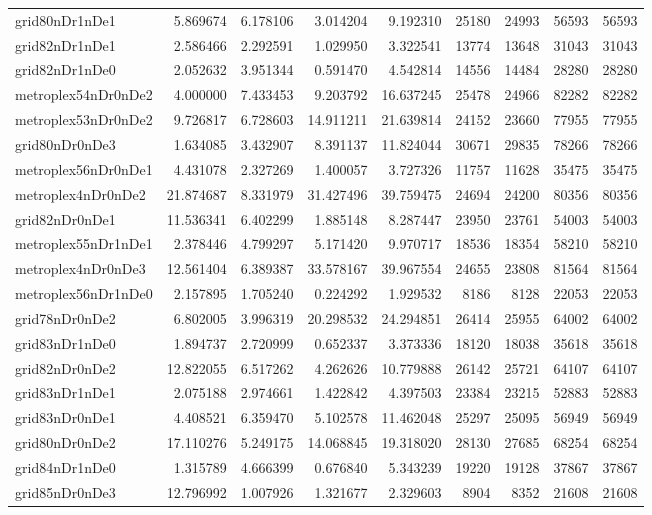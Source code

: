 \begin{longtable}{|l|r|r|r|r|r|r|r|r|}
grid80nDr1nDe1 & 5.869674 & 6.178106 & 3.014204 & 9.192310 & 25180 & 24993 & 56593 & 56593 \\
grid82nDr1nDe1 & 2.586466 & 2.292591 & 1.029950 & 3.322541 & 13774 & 13648 & 31043 & 31043 \\
grid82nDr1nDe0 & 2.052632 & 3.951344 & 0.591470 & 4.542814 & 14556 & 14484 & 28280 & 28280 \\
metroplex54nDr0nDe2 & 4.000000 & 7.433453 & 9.203792 & 16.637245 & 25478 & 24966 & 82282 & 82282 \\
metroplex53nDr0nDe2 & 9.726817 & 6.728603 & 14.911211 & 21.639814 & 24152 & 23660 & 77955 & 77955 \\
grid80nDr0nDe3 & 1.634085 & 3.432907 & 8.391137 & 11.824044 & 30671 & 29835 & 78266 & 78266 \\
metroplex56nDr0nDe1 & 4.431078 & 2.327269 & 1.400057 & 3.727326 & 11757 & 11628 & 35475 & 35475 \\
metroplex4nDr0nDe2 & 21.874687 & 8.331979 & 31.427496 & 39.759475 & 24694 & 24200 & 80356 & 80356 \\
grid82nDr0nDe1 & 11.536341 & 6.402299 & 1.885148 & 8.287447 & 23950 & 23761 & 54003 & 54003 \\
metroplex55nDr1nDe1 & 2.378446 & 4.799297 & 5.171420 & 9.970717 & 18536 & 18354 & 58210 & 58210 \\
metroplex4nDr0nDe3 & 12.561404 & 6.389387 & 33.578167 & 39.967554 & 24655 & 23808 & 81564 & 81564 \\
metroplex56nDr1nDe0 & 2.157895 & 1.705240 & 0.224292 & 1.929532 & 8186 & 8128 & 22053 & 22053 \\
grid78nDr0nDe2 & 6.802005 & 3.996319 & 20.298532 & 24.294851 & 26414 & 25955 & 64002 & 64002 \\
grid83nDr1nDe0 & 1.894737 & 2.720999 & 0.652337 & 3.373336 & 18120 & 18038 & 35618 & 35618 \\
grid82nDr0nDe2 & 12.822055 & 6.517262 & 4.262626 & 10.779888 & 26142 & 25721 & 64107 & 64107 \\
grid83nDr1nDe1 & 2.075188 & 2.974661 & 1.422842 & 4.397503 & 23384 & 23215 & 52883 & 52883 \\
grid83nDr0nDe1 & 4.408521 & 6.359470 & 5.102578 & 11.462048 & 25297 & 25095 & 56949 & 56949 \\
grid80nDr0nDe2 & 17.110276 & 5.249175 & 14.068845 & 19.318020 & 28130 & 27685 & 68254 & 68254 \\
grid84nDr1nDe0 & 1.315789 & 4.666399 & 0.676840 & 5.343239 & 19220 & 19128 & 37867 & 37867 \\
grid85nDr0nDe3 & 12.796992 & 1.007926 & 1.321677 & 2.329603 & 8904 & 8352 & 21608 & 21608 \\

\end{longtable}
